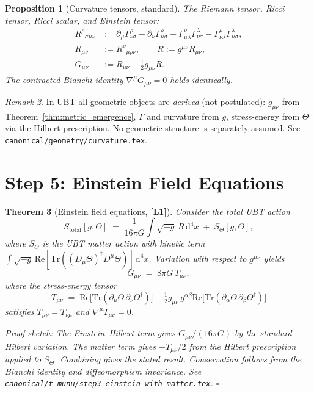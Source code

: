 \documentclass[12pt,a4paper]{article}
\newtheorem{theorem}{Theorem}[section]
\newtheorem{proposition}[theorem]{Proposition}
\theoremstyle{definition}
\theoremstyle{remark}
\newtheorem{remark}[theorem]{Remark}
\newcommand{\Lone}{\textbf{[L1]}}
\newcommand{\Stot}{S_{\mathrm{total}}}     %
\newcommand{\Tmunu}{T_{\mu\nu}}            %
\begin{document}
\begin{proposition}[Curvature tensors, standard]
\label{prop:curvature}
The Riemann tensor, Ricci tensor, Ricci scalar, and Einstein tensor:
\begin{align}
  R^\rho{}_{\sigma\mu\nu} &:= \partial_\mu\Gamma^\rho_{\nu\sigma}
    - \partial_\nu\Gamma^\rho_{\mu\sigma}
    + \Gamma^\rho_{\mu\lambda}\Gamma^\lambda_{\nu\sigma}
    - \Gamma^\rho_{\nu\lambda}\Gamma^\lambda_{\mu\sigma}, \\
  R_{\mu\nu} &:= R^\rho{}_{\mu\rho\nu}, \qquad R := g^{\mu\nu}R_{\mu\nu}, \\
  G_{\mu\nu} &:= R_{\mu\nu} - \tfrac{1}{2}g_{\mu\nu}R.
\end{align}
The contracted Bianchi identity $\nabla^\mu G_{\mu\nu} = 0$ holds identically.
\end{proposition}

\begin{remark}
In UBT all geometric objects are \emph{derived} (not postulated): $g_{\mu\nu}$
from Theorem~\ref{thm:metric_emergence}, $\Gamma$ and curvature from $g$,
stress-energy from $\Theta$ via the Hilbert prescription.  No geometric structure
is separately assumed.  See \texttt{canonical/geometry/curvature.tex}.
\end{remark}

\section{Step 5: Einstein Field Equations}
\label{sec:step5}

\begin{theorem}[Einstein field equations, \Lone]
\label{thm:einstein}
Consider the total UBT action
\[
  \Stot[g,\Theta]
  \;=\; \frac{1}{16\pi G}\int \sqrt{-g}\,R\,\mathrm{d}^4x
  \;+\; S_\Theta[g,\Theta],
\]
where $S_\Theta$ is the UBT matter action with kinetic term
$\int\!\sqrt{-g}\,\mathrm{Re}[\mathrm{Tr}((D_\mu\Theta)^\dagger D^\mu\Theta)]\,\mathrm{d}^4x$.
Variation with respect to $g^{\mu\nu}$ yields
\[
  \boxed{G_{\mu\nu} \;=\; 8\pi G\,\Tmunu,}
\]
where the stress-energy tensor
\[
  \Tmunu \;=\; \mathrm{Re}\bigl[\mathrm{Tr}(\partial_\mu\Theta\,\partial_\nu\Theta^\dagger)\bigr]
  - \tfrac{1}{2}g_{\mu\nu}\,g^{\alpha\beta}
    \mathrm{Re}\bigl[\mathrm{Tr}(\partial_\alpha\Theta\,\partial_\beta\Theta^\dagger)\bigr]
\]
satisfies $\Tmunu = T_{\nu\mu}$ and $\nabla^\mu \Tmunu = 0$.

\medskip
\emph{Proof sketch}: The Einstein–Hilbert term gives $G_{\mu\nu}/(16\pi G)$ by the
standard Hilbert variation.  The matter term gives $-\Tmunu/2$ from the Hilbert
prescription applied to $S_\Theta$.  Combining gives the stated result.
Conservation follows from the Bianchi identity and diffeomorphism invariance.
See \texttt{canonical/t\_munu/step3\_einstein\_with\_matter.tex}.
\hfill$\square$
\end{theorem}
\end{document}
